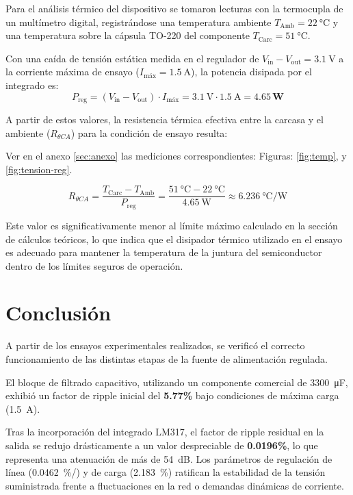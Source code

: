 \documentclass[12pt,a4paper]{article}
\begin{document}
Para el análisis térmico del dispositivo se tomaron lecturas con la termocupla de un multímetro digital, registrándose 
una temperatura ambiente $T_{\text{Amb}} = \SI{22}{\celsius}$ y una temperatura sobre la cápsula TO-220 del componente $T_{\text{Carc}} = \SI{51}{\celsius}$. 

Con una caída de tensión estática medida en el regulador de $V_{\text{in}} - V_{\text{out}} = \SI{3.1}{\V}$ a la corriente máxima de ensayo ($I_{\text{máx}} = \SI{1.5}{\A}$), la potencia disipada por el integrado es:
\begin{equation}
    P_{\text{reg}} = (V_{\text{in}} - V_{\text{out}}) \cdot I_{\text{máx}} = \SI{3.1}{\V} \cdot \SI{1.5}{\A} = \mathbf{4.65\,\text{W}}
\end{equation}

A partir de estos valores, la resistencia térmica efectiva entre la carcasa y el ambiente ($R_{\theta CA}$) para la condición de ensayo resulta:

Ver en el anexo \ref{sec:anexo} las mediciones correspondientes: Figuras: \ref{fig:temp}, y \ref{fig:tension-reg}.

\begin{equation}
    R_{\theta CA} = \frac{T_{\text{Carc}} - T_{\text{Amb}}}{P_{\text{reg}}} = \frac{\SI{51}{\celsius} - \SI{22}{\celsius}}{\SI{4.65}{\W}} \approx \SI{6.236}{\celsius\per\W}
\end{equation}

Este valor es significativamente menor al límite máximo calculado en la sección de cálculos teóricos, lo que indica que
el disipador térmico utilizado en el ensayo es adecuado para mantener la temperatura de la juntura del semiconductor
dentro de los límites seguros de operación.


\section{Conclusión}
A partir de los ensayos experimentales realizados, se verificó el correcto funcionamiento de las distintas etapas de la
fuente de alimentación regulada.

El bloque de filtrado capacitivo, utilizando un componente comercial de \SI{3300}{\micro\F}, exhibió un factor de ripple
inicial del \textbf{5.77\%} bajo condiciones de máxima carga (\SI{1.5}{\A}).

Tras la incorporación del integrado LM317, el factor de ripple
residual en la salida se redujo drásticamente a un valor despreciable de \textbf{0.0196\%}, lo que representa una atenuación
de más de \SI{54}{\dB}. Los parámetros de regulación de línea (\SI{0.0462}{\%/}) y de carga (\SI{2.183}{\%}) ratifican
la estabilidad de la tensión suministrada frente a fluctuaciones en la red o demandas dinámicas de corriente. 
\end{document}
